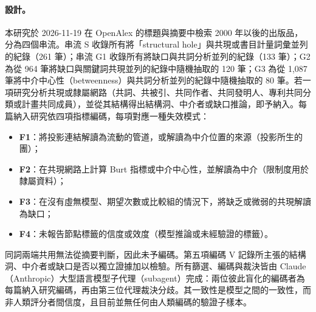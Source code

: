 \paragraph{設計。} 本研究於 2026-11-19 在 OpenAlex 的標題與摘要中檢索 2000 年以後的出版品，分為四個串流。串流 S 收錄所有將「structural hole」與共現或書目計量詞彙並列的紀錄（261 筆）；串流 G1 收錄所有將缺口與共詞分析並列的紀錄（133 筆）；G2 為從 964 筆將缺口與關鍵詞共現並列的紀錄中隨機抽取的 120 筆；G3 為從 1,087 筆將中介中心性（betweenness）與共詞分析並列的紀錄中隨機抽取的 80 筆。若一項研究分析共現或隸屬網路（共詞、共被引、共同作者、共同發明人、專利共同分類或計畫共同成員），並從其結構得出結構洞、中介者或缺口推論，即予納入。每篇納入研究依四項指標編碼，每項對應一種失效模式：
\begin{itemize}
  \item \textbf{F1}：將投影連結解讀為流動的管道，或解讀為中介位置的來源（投影所生的團）；
  \item \textbf{F2}：在共現網路上計算 Burt 指標或中介中心性，並解讀為中介（限制度用於隸屬資料）；
  \item \textbf{F3}：在沒有虛無模型、期望次數或比較組的情況下，將缺乏或微弱的共現解讀為缺口；
  \item \textbf{F4}：未報告節點標籤的信度或效度（模型推論或未經驗證的標籤）。
\end{itemize}
同詞兩端共用無法從摘要判斷，因此未予編碼。第五項編碼 V 記錄所主張的結構洞、中介者或缺口是否以獨立證據加以檢驗。所有篩選、編碼與裁決皆由 Claude（Anthropic）大型語言模型子代理（subagent）完成：兩位彼此盲化的編碼者為每篇納入研究編碼，再由第三位代理裁決分歧。其一致性是模型之間的一致性，而非人類評分者間信度，且目前並無任何由人類編碼的驗證子樣本。

